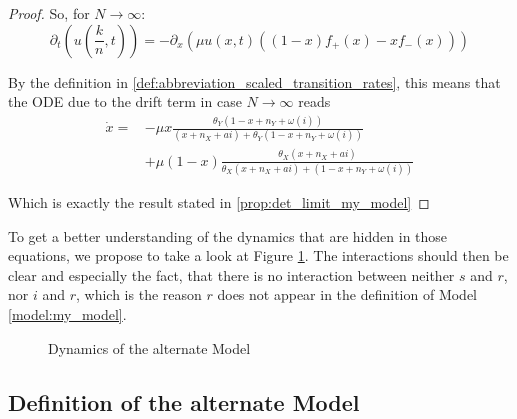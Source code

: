 \documentclass[12pt,a4paper,twoside]{article}
\begin{document}
\begin{proof}
	So, for $N \rightarrow \infty$:
	\begin{equation}
	\partial_t \left(u\left(\frac{k}{n}, t\right)\right) = -\partial_x\left(\mu u(x,t)\left((1-x)f_+(x) - xf_-(x)\right)\right)
	\end{equation}
	
	By the definition in \eqref{def:abbreviation_scaled_transition_rates}, this means that the ODE due to the drift term in case $N \rightarrow \infty$ reads 
	\begin{align*}
	\dot{x} = &-\mu x\frac{\theta_Y(1-x+n_Y+\omega\left(i\right))}{(x+n_X+ai) + \theta_Y(1-x+n_Y+\omega\left(i\right))}\\
	\qquad&+ \mu \left(1-x\right)\frac{\theta_X (x+ n_X+ ai)}{\theta_X (x + n_X + ai) + (1-x + n_Y + \omega\left(i\right))}
	\end{align*}
	
	Which is exactly the result stated in \eqref{prop:det_limit_my_model}
\end{proof}

To get a better understanding of the dynamics that are hidden in those equations, we propose to take a look at Figure \ref{fig:my_model}. The interactions should then be clear and especially the fact, that there is no interaction between neither $s$ and $r$, nor $i$ and $r$, which is the reason $r$ does not appear in the definition of Model \ref{model:my_model}. 

\begin{figure}[h!]
	\centering
	\def\svgwidth{450pt}
	
	\caption{Dynamics of the alternate Model}
	\label{fig:my_model}
\end{figure}

\subsection{Definition of the alternate Model}
\end{document}
